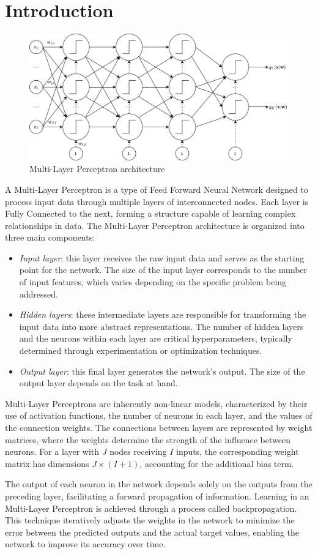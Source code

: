 \section{Introduction}

\begin{figure}[H]
    \centering
    \includegraphics[width=0.75\linewidth]{images/ffnn.png}
    \caption{Multi-Layer Perceptron architecture}
\end{figure}
A Multi-Layer Perceptron is a type of Feed Forward Neural Network designed to process input data through multiple layers of interconnected nodes.
Each layer is Fully Connected to the next, forming a structure capable of learning complex relationships in data.
The Multi-Layer Perceptron architecture is organized into three main components:
\begin{itemize}
    \item \textit{Input layer}: this layer receives the raw input data and serves as the starting point for the network. 
        The size of the input layer corresponds to the number of input features, which varies depending on the specific problem being addressed.
    \item \textit{Hidden layers}: these intermediate layers are responsible for transforming the input data into more abstract representations.
        The number of hidden layers and the neurons within each layer are critical hyperparameters, typically determined through experimentation or optimization techniques.
    \item \textit{Output layer}: this final layer generates the network's output.
        The size of the output layer depends on the task at hand.
\end{itemize}
Multi-Layer Perceptrons are inherently non-linear models, characterized by their use of activation functions, the number of neurons in each layer, and the values of the connection weights.
The connections between layers are represented by weight matrices, where the weights determine the strength of the influence between neurons. 
For a layer with $J$ nodes receiving $I$ inputs, the corresponding weight matrix has dimensions $J \times (I+1)$, accounting for the additional bias term.

The output of each neuron in the network depends solely on the outputs from the preceding layer, facilitating a forward propagation of information.
Learning in an Multi-Layer Perceptron is achieved through a process called backpropagation.
This technique iteratively adjusts the weights in the network to minimize the error between the predicted outputs and the actual target values, enabling the network to improve its accuracy over time.